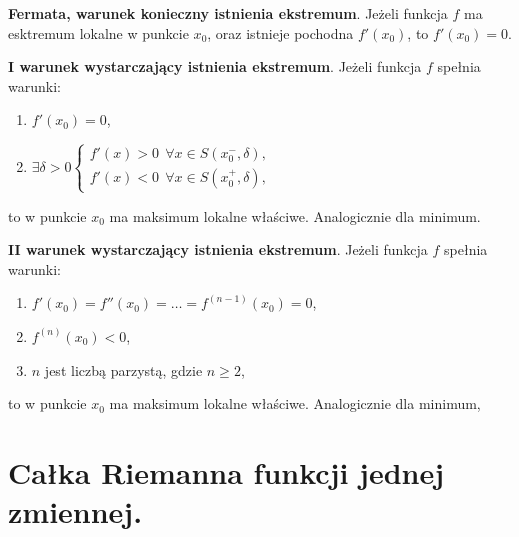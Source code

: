 \documentclass[main.tex]{subfiles}
\begin{document}
    \begin{theorem}
        \textbf{Fermata, warunek konieczny istnienia ekstremum}. Jeżeli funkcja $f$ ma esktremum lokalne w punkcie $x_0$,
        oraz istnieje pochodna $f'(x_0)$, to $f'(x_0) = 0$.
    \end{theorem}

    \begin{theorem}
        \textbf{I warunek wystarczający istnienia ekstremum}. Jeżeli funkcja $f$ spełnia warunki:
        \begin{enumerate}
            \item $f'(x_0) = 0$,
            \item $\exists \delta > 0
            \left\{\begin{matrix}
                       f'(x) > 0 ~~ \forall x \in  S(x^{-}_0, \delta), \\
                       f'(x) < 0 ~~ \forall x \in  S(x^{+}_0, \delta),
            \end{matrix}\right.$
        \end{enumerate}
        to w punkcie $x_0$ ma maksimum lokalne właściwe. Analogicznie dla minimum.
    \end{theorem}

    \begin{theorem}
        \textbf{II warunek wystarczający istnienia ekstremum}. Jeżeli funkcja $f$ spełnia warunki:
        \begin{enumerate}
            \item $f'(x_0) = f''(x_0) = \dots = f^{(n-1)}(x_0) = 0$,
            \item $f^{(n)}(x_0) < 0$,
            \item $n$ jest liczbą parzystą, gdzie $n \geq 2$,
        \end{enumerate}
        to w punkcie $x_0$ ma maksimum lokalne właściwe. Analogicznie dla minimum,
    \end{theorem}


    \section{Całka Riemanna funkcji jednej zmiennej.}
\end{document}
